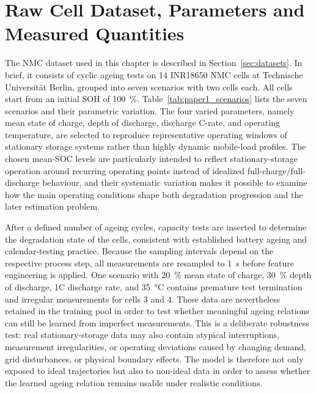 \documentclass[
    a4paper,
    12pt,
    titlepage,
    bibliography=totoc,
    twoside=on,
    parskip=false,
    numbers=noenddot,
    cleardoublepage=empty,
    DIV=12,
    BCOR=12.0mm,
    headheight=36pt,
    headings=openright
]{scrreprt}
\begin{document}
\section{Raw Cell Dataset, Parameters and Measured Quantities}
The NMC dataset used in this chapter is described in Section~\ref{sec:datasets}. In brief, it consists of cyclic ageing tests on 14 INR18650 NMC cells at Technische Universit\"at Berlin, grouped into seven scenarios with two cells each. All cells start from an initial SOH of \SI{100}{\percent}. Table~\ref{tab:paper1_scenarios} lists the seven scenarios and their parametric variation. The four varied parameters, namely mean state of charge, depth of discharge, discharge C-rate, and operating temperature, are selected to reproduce representative operating windows of stationary storage systems rather than highly dynamic mobile-load profiles.\autocite{kucevicStandardBatteryEnergy2020a} The chosen mean-SOC levels are particularly intended to reflect stationary-storage operation around recurring operating points instead of idealized full-charge/full-discharge behaviour, and their systematic variation makes it possible to examine how the main operating conditions shape both degradation progression and the later estimation problem.

After a defined number of ageing cycles, capacity tests are inserted to determine the degradation state of the cells, consistent with established battery ageing and calendar-testing practice.\autocite{kassemCalendarAgingGraphite2012} Because the sampling intervals depend on the respective process step, all measurements are resampled to \SI{1}{\second} before feature engineering is applied. One scenario with \SI{20}{\percent} mean state of charge, \SI{30}{\percent} depth of discharge, 1C discharge rate, and \SI{35}{\celsius} contains premature test termination and irregular measurements for cells 3 and 4. These data are nevertheless retained in the training pool in order to test whether meaningful ageing relations can still be learned from imperfect measurements. This is a deliberate robustness test: real stationary-storage data may also contain atypical interruptions, measurement irregularities, or operating deviations caused by changing demand, grid disturbances, or physical boundary effects. The model is therefore not only exposed to ideal trajectories but also to non-ideal data in order to assess whether the learned ageing relation remains usable under realistic conditions.
\end{document}
